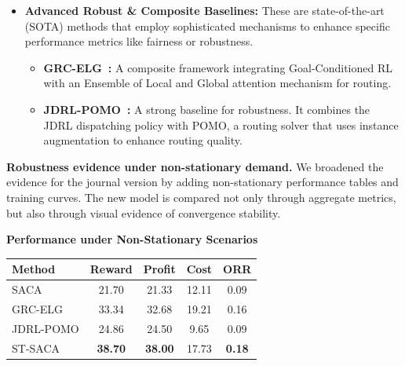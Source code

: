 \documentclass[11pt, a4paper]{article}
\begin{document}
\begin{itemize}
\begin{boxedminipage}[htbp]{\linewidth}
\begin{itemize}
        \item \textbf{Advanced Robust \& Composite Baselines:} These are state-of-the-art (SOTA) methods that employ sophisticated mechanisms to enhance specific performance metrics like fairness or robustness.
        \begin{itemize}
            \item \textbf{GRC-ELG~\cite{ref:Lei2023, ref:Yoon2024IJCAI}:} A composite framework integrating Goal-Conditioned RL with an Ensemble of Local and Global attention mechanism for routing.
            \item \textbf{JDRL-POMO~\cite{ref:Sun2022KDD, ref:KwonPOMO2020}:} A strong baseline for robustness. It combines the JDRL dispatching policy with POMO, a routing solver that uses instance augmentation to enhance routing quality.
        \end{itemize}
    \end{itemize}
    \end{boxedminipage}

    \textbf{Robustness evidence under non-stationary demand.} We broadened the evidence for the journal version by adding non-stationary performance tables and training curves. The new model is compared not only through aggregate metrics, but also through visual evidence of convergence stability.

    \begin{boxedminipage}[htbp]{\linewidth}
    \vspace{2mm}
    \textbf{Performance under Non-Stationary Scenarios}

    \begin{center}
    \captionsetup{font=normalsize}
    \normalsize
    \setlength{\tabcolsep}{5pt}
    \begin{tabular}{@{}lcccc@{}}
    \toprule
    Method & Reward & Profit & Cost & ORR \\
    \midrule
    SACA & 21.70 & 21.33 & 12.11 & 0.09 \\
    GRC-ELG & 33.34 & 32.68 & 19.21 & 0.16 \\
    JDRL-POMO & 24.86 & 24.50 & 9.65 & 0.09 \\
    ST-SACA & \textbf{38.70} & \textbf{38.00} & 17.73 & \textbf{0.18} \\
    \bottomrule
    \end{tabular}
    \end{center}


\end{boxedminipage}
\end{itemize}
\end{document}
